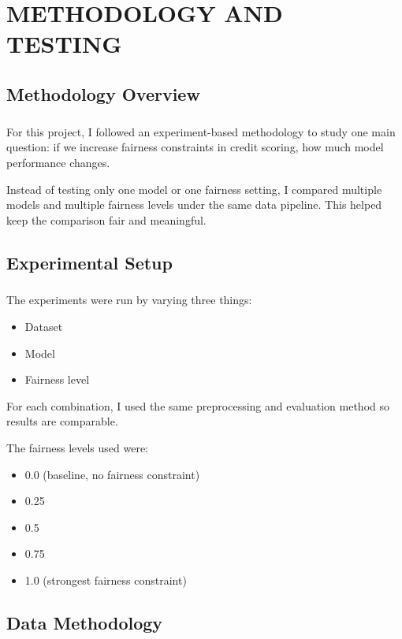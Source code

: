 \chapter{\MakeUppercase{Methodology and Testing}}

\section{Methodology Overview}
\paragraph{}

For this project, I followed an experiment-based methodology to study one main question: if we increase fairness constraints in credit scoring, how much model performance changes.

Instead of testing only one model or one fairness setting, I compared multiple models and multiple fairness levels under the same data pipeline. This helped keep the comparison fair and meaningful.

\section{Experimental Setup}
\paragraph{}

The experiments were run by varying three things:
\begin{itemize}
    \item Dataset
    \item Model
    \item Fairness level
\end{itemize}

For each combination, I used the same preprocessing and evaluation method so results are comparable.

The fairness levels used were:
\begin{itemize}
    \item 0.0 (baseline, no fairness constraint)
    \item 0.25
    \item 0.5
    \item 0.75
    \item 1.0 (strongest fairness constraint)
\end{itemize}

\section{Data Methodology}
